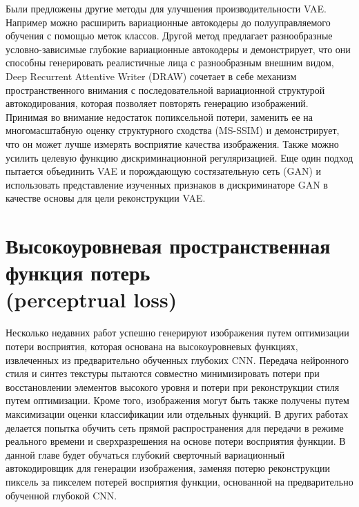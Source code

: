 Были предложены другие методы для улучшения производительности VAE. Например можно расширить вариационные автокодеры до полууправляемого обучения с помощью меток классов. Другой метод предлагает разнообразные условно-зависимые глубокие вариационные автокодеры и демонстрирует, что они способны генерировать реалистичные лица с разнообразным внешним видом, Deep Recurrent Attentive Writer (DRAW) сочетает в себе механизм пространственного внимания с последовательной вариационной структурой автокодирования, которая позволяет повторять генерацию изображений. Принимая во внимание недостаток попиксельной потери, заменить ее на многомасштабную оценку структурного сходства (MS-SSIM) и демонстрирует, что он может лучше измерять восприятие качества изображения. Также можно усилить целевую функцию дискриминационной регуляризацией. Еще один подход пытается объединить VAE и порождающую состязательную сеть (GAN) и использовать представление изученных признаков в дискриминаторе GAN в качестве основы для цели реконструкции VAE.
\section{Высокоуровневая пространственная функция потерь \\ (perceptrual loss)}

Несколько недавних работ успешно генерируют изображения путем оптимизации потери восприятия, которая основана на высокоуровневых функциях, извлеченных из предварительно обученных глубоких CNN. Передача нейронного стиля и синтез текстуры пытаются совместно минимизировать потери при восстановлении элементов высокого уровня и потери при реконструкции стиля путем оптимизации. Кроме того, изображения могут быть также получены путем максимизации оценки классификации или отдельных функций. В других работах делается попытка обучить сеть прямой распространения для передачи в режиме реального времени и сверхразрешения на основе потери восприятия функции. В данной главе будет обучаться глубокий сверточный вариационный автокодировщик для генерации изображения, заменяя потерю реконструкции пиксель за пикселем потерей восприятия функции, основанной на предварительно обученной глубокой CNN.

